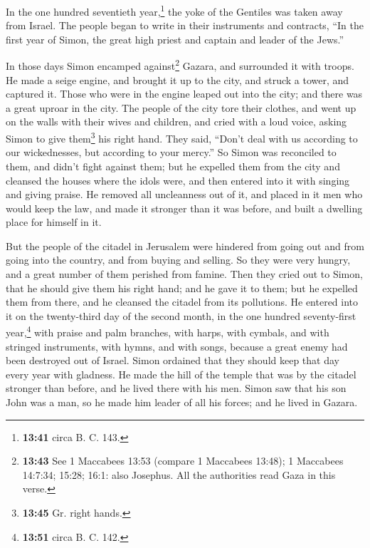  In the one hundred seventieth year,\footnote{\textbf{13:41}
  circa B. C. 143.} the yoke of the Gentiles was taken away from Israel.
 The people began to write in their instruments and
contracts, ``In the first year of Simon, the great high priest and
captain and leader of the Jews.''

 In those days Simon encamped against\footnote{\textbf{13:43}
  See 1 Maccabees 13:53 (compare 1 Maccabees 13:48); 1 Maccabees
  14:7:34; 15:28; 16:1: also Josephus. All the authorities read Gaza in
  this verse.} Gazara, and surrounded it with troops. He made a seige
engine, and brought it up to the city, and struck a tower, and captured
it.  Those who were in the engine leaped out into the
city; and there was a great uproar in the city.  The
people of the city tore their clothes, and went up on the walls with
their wives and children, and cried with a loud voice, asking Simon to
give them\footnote{\textbf{13:45} Gr. right hands.} his right hand.
 They said, ``Don't deal with us according to our
wickednesses, but according to your mercy.''  So Simon
was reconciled to them, and didn't fight against them; but he expelled
them from the city and cleansed the houses where the idols were, and
then entered into it with singing and giving praise.  He
removed all uncleanness out of it, and placed in it men who would keep
the law, and made it stronger than it was before, and built a dwelling
place for himself in it.

 But the people of the citadel in Jerusalem were hindered
from going out and from going into the country, and from buying and
selling. So they were very hungry, and a great number of them perished
from famine.  Then they cried out to Simon, that he
should give them his right hand; and he gave it to them; but he expelled
them from there, and he cleansed the citadel from its pollutions.
 He entered into it on the twenty-third day of the second
month, in the one hundred seventy-first year,\footnote{\textbf{13:51}
  circa B. C. 142.} with praise and palm branches, with harps, with
cymbals, and with stringed instruments, with hymns, and with songs,
because a great enemy had been destroyed out of Israel. 
Simon ordained that they should keep that day every year with gladness.
He made the hill of the temple that was by the citadel stronger than
before, and he lived there with his men.  Simon saw that
his son John was a man, so he made him leader of all his forces; and he
lived in Gazara.

